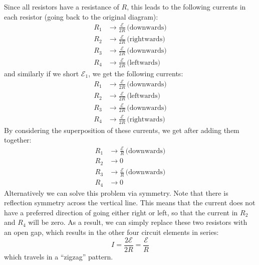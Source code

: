 \documentclass{article}
\begin{document}
\begin{example}
\begin{center}
        \end{center}
        Since all resistors have a resistance of $R$, this leads to the following currents in each resistor (going back to the original diagram):
        \begin{align*}
            R_1 &\rightarrow \frac{\mathcal{E}}{2R} \, \text{(downwards)} \\ 
            R_2 &\rightarrow \frac{\mathcal{E}}{2R} \, \text{(rightwards)} \\ 
            R_3 &\rightarrow \frac{\mathcal{E}}{2R} \, \text{(downwards)} \\
            R_4 &\rightarrow \frac{\mathcal{E}}{2R} \, \text{(leftwards)}
        \end{align*}
        and similarly if we short $\mathcal{E}_1$, we get the following currents:
        \begin{align*}
            R_1 &\rightarrow \frac{\mathcal{E}}{2R} \, \text{(downwards)} \\ 
            R_2 &\rightarrow \frac{\mathcal{E}}{2R} \, \text{(leftwards)} \\ 
            R_3 &\rightarrow \frac{\mathcal{E}}{2R} \, \text{(downwards)} \\
            R_4 &\rightarrow \frac{\mathcal{E}}{2R} \, \text{(rightwards)}
        \end{align*}
        By considering the superposition of these currents, we get after adding them together:
        \begin{align*}
            R_1 &\rightarrow \frac{\mathcal{E}}{R} \, \text{(downwards)} \\ 
            R_2 &\rightarrow 0 \\ 
            R_3 &\rightarrow \frac{\mathcal{E}}{R} \, \text{(downwards)} \\
            R_4 &\rightarrow 0
        \end{align*}
        Alternatively we can solve this problem via symmetry. Note that there is reflection symmetry across the vertical line. This means that the current does not have a preferred direction of going either right or left, so that the current in $R_2$ and $R_4$ will be zero. As a result, we can simply replace these two resistors with an open gap, which results in the other four circuit elements in series:
        $$    I = \frac{2\mathcal{E}}{2R} = \frac{\mathcal{E}}{R}
        $$
        which travels in a ``zigzag'' pattern.
    \end{example}
    
\end{document}
